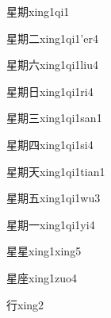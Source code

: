 \begin{verbete}[9;12]{星期}{xing1qi1}
\end{verbete}

\begin{verbete}[9;12;2]{星期二}{xing1qi1'er4}
\end{verbete}

\begin{verbete}[9;12;3]{星期六}{xing1qi1liu4}
\end{verbete}

\begin{verbete}[9;12;4]{星期日}{xing1qi1ri4}
\end{verbete}

\begin{verbete}[9;12;3]{星期三}{xing1qi1san1}
\end{verbete}

\begin{verbete}[9;12;5]{星期四}{xing1qi1si4}
\end{verbete}

\begin{verbete}[9;12;4]{星期天}{xing1qi1tian1}
\end{verbete}

\begin{verbete}[9;12;4]{星期五}{xing1qi1wu3}
\end{verbete}

\begin{verbete}[9;12;1]{星期一}{xing1qi1yi4}
\end{verbete}

\begin{verbete}[9;9]{星星}{xing1xing5}
\end{verbete}

\begin{verbete}[9;10]{星座}{xing1zuo4}
\end{verbete}

\begin{verbete}[6]{行}{xing2}
\end{verbete}

